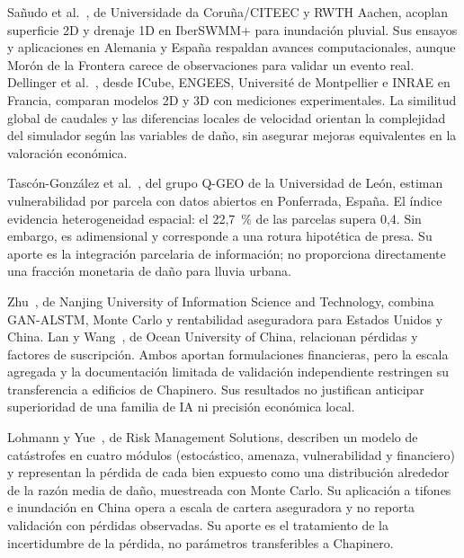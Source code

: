 \documentclass[journal]{IEEEtran}
\begin{document}
Sañudo et al.~\cite{sanudo2025}, de Universidade da Coruña/CITEEC y RWTH Aachen, acoplan superficie 2D y drenaje 1D en IberSWMM+ para inundación pluvial. Sus ensayos y aplicaciones en Alemania y España respaldan avances computacionales, aunque Morón de la Frontera carece de observaciones para validar un evento real. Dellinger et al.~\cite{dellinger2025}, desde ICube, ENGEES, Université de Montpellier e INRAE en Francia, comparan modelos 2D y 3D con mediciones experimentales. La similitud global de caudales y las diferencias locales de velocidad orientan la complejidad del simulador según las variables de daño, sin asegurar mejoras equivalentes en la valoración económica.

Tascón-González et al.~\cite{tascon2024}, del grupo Q-GEO de la Universidad de León, estiman vulnerabilidad por parcela con datos abiertos en Ponferrada, España. El índice evidencia heterogeneidad espacial: el 22,7~\% de las parcelas supera 0,4. Sin embargo, es adimensional y corresponde a una rotura hipotética de presa. Su aporte es la integración parcelaria de información; no proporciona directamente una fracción monetaria de daño para lluvia urbana.

Zhu~\cite{zhu2024}, de Nanjing University of Information Science and Technology, combina GAN-ALSTM, Monte Carlo y rentabilidad aseguradora para Estados Unidos y China. Lan y Wang~\cite{lan2024}, de Ocean University of China, relacionan pérdidas y factores de suscripción. Ambos aportan formulaciones financieras, pero la escala agregada y la documentación limitada de validación independiente restringen su transferencia a edificios de Chapinero. Sus resultados no justifican anticipar superioridad de una familia de IA ni precisión económica local.

Lohmann y Yue~\cite{lohmann2011}, de Risk Management Solutions, describen un modelo de catástrofes en cuatro módulos (estocástico, amenaza, vulnerabilidad y financiero) y representan la pérdida de cada bien expuesto como una distribución alrededor de la razón media de daño, muestreada con Monte Carlo. Su aplicación a tifones e inundación en China opera a escala de cartera aseguradora y no reporta validación con pérdidas observadas. Su aporte es el tratamiento de la incertidumbre de la pérdida, no parámetros transferibles a Chapinero.
\end{document}

